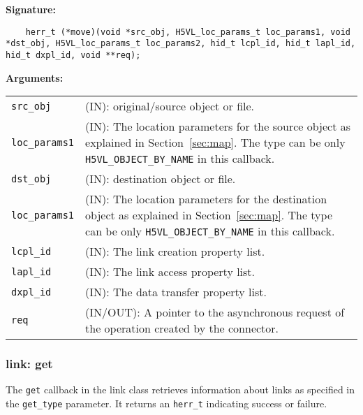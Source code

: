 \begin{mdframed}[style=bgbox]
\textbf{Signature:}
\begin{lstlisting}
    herr_t (*move)(void *src_obj, H5VL_loc_params_t loc_params1, void *dst_obj, H5VL_loc_params_t loc_params2, hid_t lcpl_id, hid_t lapl_id, hid_t dxpl_id, void **req);
\end{lstlisting}

\textbf{Arguments:}\\
\begin{tabular}{l p{13.5cm}}
  \texttt{src\_obj} & (IN): original/source object or file. \\
  \texttt{loc\_params1} & (IN): The location parameters for the source
  object as explained in Section~\ref{sec:map}. The type can be only \texttt{H5VL\_OBJECT\_BY\_NAME} in this callback. \\
  \texttt{dst\_obj} & (IN): destination object or file. \\
  \texttt{loc\_params1} & (IN): The location parameters for the destination
  object as explained in Section~\ref{sec:map}. The type can be only \texttt{H5VL\_OBJECT\_BY\_NAME} in this callback. \\
  \texttt{lcpl\_id} & (IN): The link creation property list.\\
  \texttt{lapl\_id} & (IN): The link access property list.\\
  \texttt{dxpl\_id} & (IN): The data transfer property list.\\
  \texttt{req} & (IN/OUT): A pointer to the asynchronous request of the
  operation created by the connector.\\
\end{tabular}
\end{mdframed}

\subsubsection{link: get}
The \texttt{get} callback in the link class retrieves information
about links as specified in the \texttt{get\_type} parameter. It
returns an \texttt{herr\_t} indicating success or failure.\bigskip

